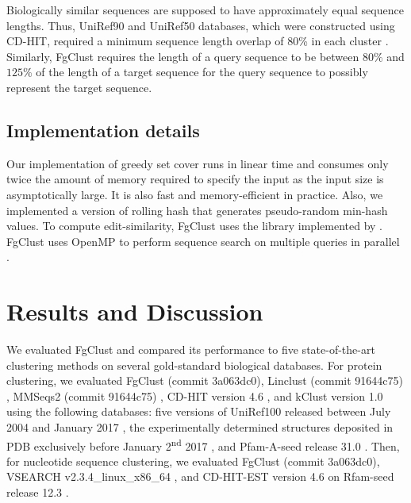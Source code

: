 \documentclass[11pt,letterpaper]{llncs2e/llncs}
\begin{document}
Biologically similar sequences are supposed to have approximately equal sequence lengths.
Thus, UniRef90 and UniRef50 databases, which were constructed using CD-HIT, required a minimum sequence length overlap of 80\% in each cluster \citep{suzek2014uniref}.
Similarly, FgClust requires the length of a query sequence to be between \(80\%\) and \(125\%\) of the length of a target sequence for the query sequence to possibly represent the target sequence. 

\subsection{Implementation details}

Our implementation of greedy set cover runs in linear time and consumes only twice the amount of memory required to specify the input as the input size is asymptotically large. It is also fast and memory-efficient in practice. Also, we implemented a version of rolling hash that generates pseudo-random min-hash values.
To compute edit-similarity, FgClust uses the library implemented by \citet{vsovsic2017edlib}.
FgClust uses OpenMP to perform sequence search on multiple queries in parallel \citep{dagum1998openmp}.


\section{Results and Discussion}

We evaluated FgClust and compared its performance to five state-of-the-art clustering methods on several gold-standard biological databases.
For protein clustering,
we evaluated FgClust (commit 3a063dc0),
Linclust (commit 91644c75) \citep{steinegger2017linclust}, 
MMSeqs2 (commit 91644c75) \citep{steinegger2017mmseqs2}, 
CD-HIT version 4.6 \citep{fu2012cd},
and kClust version 1.0 \citep{hauser2013kclust} using the following databases:
five versions of UniRef100 released between July 2004 and January 2017 \citep{suzek2014uniref},
the experimentally determined structures deposited in PDB exclusively before January 2\textsuperscript{nd} 2017 \citep{berman2006protein},
and Pfam-A-seed release 31.0 \cite{finn2016pfam}.
Then, for nucleotide sequence clustering, we evaluated FgClust
(commit 3a063dc0), %
VSEARCH v2.3.4\_linux\_x86\_64 \citep{rognes2016vsearch}, and CD-HIT-EST version 4.6 \citep{fu2012cd} on Rfam-seed release 12.3 \citep{nawrocki2014rfam}.
\end{document}
